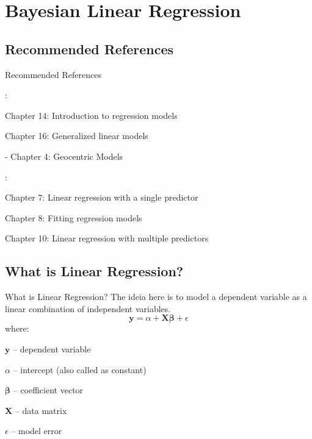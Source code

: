 \section{Bayesian Linear Regression}

\subsection{Recommended References}
\begin{frame}{Recommended References}
	\begin{vfilleditems}
		\item \textcite{gelman2013bayesian}:
		\begin{vfilleditems}
			\item Chapter 14: Introduction to regression models
			\item Chapter 16: Generalized linear models
		\end{vfilleditems}
		\item \textcite{mcelreath2020statistical} - Chapter 4: Geocentric Models
		\item \textcite{gelman2020regression}:
		\begin{vfilleditems}
			\item Chapter 7: Linear regression with a single predictor
			\item Chapter 8: Fitting regression models
			\item Chapter 10: Linear regression with multiple predictors
		\end{vfilleditems}
	\end{vfilleditems}
\end{frame}

\subsection{What is Linear Regression?}
\begin{frame}{What is Linear Regression?}
	The ideia here is to model a dependent variable as a linear combination
	of independent variables.
	$$
		\boldsymbol{y} = \alpha +  \mathbf{X} \boldsymbol{\beta} + \epsilon
	$$
	where:
	\begin{vfilleditems}
		\item $\boldsymbol{y}$ -- dependent variable
		\item $\alpha$ -- intercept (also called as constant)
		\item $\boldsymbol{\beta}$ -- coefficient vector
		\item $\mathbf{X}$ -- data matrix
		\item $\epsilon$ -- model error
	\end{vfilleditems}
\end{frame}

